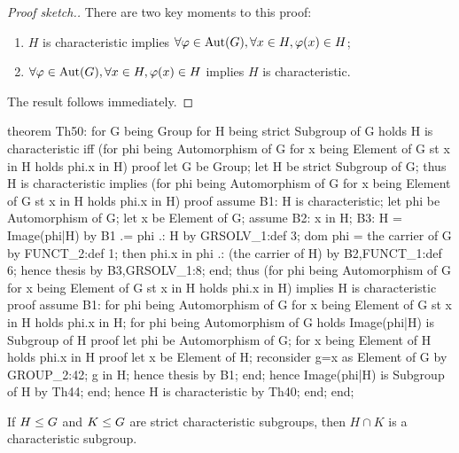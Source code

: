 \begin{proof}[Proof sketch.]
There are two key moments to this proof:
\begin{enumerate}
\item $H$ is characteristic implies $\forall\varphi\in\operatorname{Aut}(G),\forall x\in H,\varphi(x)\in H$;
\item $\forall\varphi\in\operatorname{Aut}(G),\forall x\in H,\varphi(x)\in H$ implies $H$ is characteristic.
\end{enumerate}
The result follows immediately.
\end{proof}

\nwenddocs{}\endmoddef\nwstartdeflinemarkup{}\nwenddeflinemarkup
theorem Th50:
  for G being Group
  for H being strict Subgroup of G
  holds H is characteristic iff
        (for phi being Automorphism of G
         for x being Element of G
         st x in H
         holds phi.x in H)
proof
  let G be Group;
  let H be strict Subgroup of G;
  thus H is characteristic implies (for phi being Automorphism of G
                                    for x being Element of G
                                    st x in H
                                    holds phi.x in H)
  proof
    assume B1: H is characteristic;
    let phi be Automorphism of G;
    let x be Element of G;
    assume B2: x in H;
    B3: H = Image(phi|H) by B1
         .= phi .: H by GRSOLV_1:def 3;
    dom phi = the carrier of G by FUNCT_2:def 1;
    then phi.x in phi .: (the carrier of H) by B2,FUNCT_1:def 6;
    hence thesis by B3,GRSOLV_1:8;
  end;
  thus (for phi being Automorphism of G
        for x being Element of G
        st x in H
        holds phi.x in H)
       implies H is characteristic
  proof
    assume B1: for phi being Automorphism of G
               for x being Element of G st x in H holds phi.x in H;
    for phi being Automorphism of G holds Image(phi|H) is Subgroup of H
    proof
      let phi be Automorphism of G;
      for x being Element of H holds phi.x in H
      proof
        let x be Element of H;
        reconsider g=x as Element of G by GROUP_2:42;
        g in H;
        hence thesis by B1;
      end;
      hence Image(phi|H) is Subgroup of H by Th44;
    end;
    hence H is characteristic by Th40;
  end;
end;
\eatline
{}\nwendcode{}\nwdocspar
\begin{theorem}
If $H\leq G$ and $K\leq G$ are strict characteristic subgroups,
then $H\cap K$ is a characteristic subgroup.
\end{theorem}

